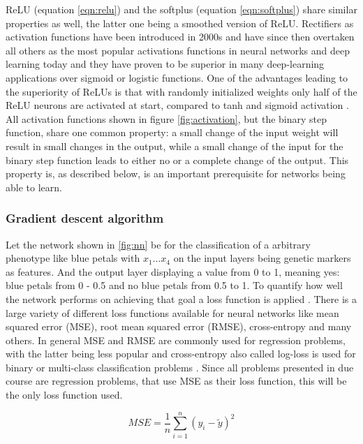 ReLU (equation \ref{eqn:relu}) and the softplus (equation \ref{eqn:softplus}) share similar properties as
well, the latter one being a smoothed version of ReLU. Rectifiers as activation functions have been introduced
in 2000s \cite{hahnloser2000digital} and have since then overtaken all others as the most popular activations
functions in neural networks and deep learning today \cite{lecun2015deep} and they have proven to be superior
in many deep-learning applications over sigmoid or logistic functions. One of the advantages leading to the
superiority of ReLUs is that with randomly initialized weights only half of the ReLU neurons are activated at start,
compared to tanh and sigmoid activation \cite{glorot2011deep}. All activation functions shown in figure
\ref{fig:activation}, but the binary step function, share one common property: a small change of the input
weight will result in small changes in the output, while a small change of the input for the binary step
function leads to either no or a complete change of the output. This property is, as described below, is an
important prerequisite for networks being able to learn. \\

\subsubsection{Gradient descent algorithm}

Let the network shown in \ref{fig:nn} be for the classification of a arbitrary phenotype like blue petals with
$x_1 \dots x_4$ on the input layers being genetic markers as features. And the output layer displaying a value
from 0 to 1, meaning yes: blue petals from 0 - 0.5 and no blue petals from 0.5 to 1. To quantify how well the
network performs on achieving that goal a loss function is applied \cite{schmidhuber2015deep}. There is a
large variety of different loss functions available for neural networks like mean squared error (MSE), root
mean squared error (RMSE), cross-entropy and many others. In general MSE and RMSE are commonly used for regression
problems, with the latter being less popular and cross-entropy also called log-loss is used for binary or
multi-class classification problems \cite{janocha2017loss}. Since all problems presented in due course are
regression problems, that use MSE as their loss function, this will be the only loss function used.

\begin{equation}
 MSE = \frac{1}{n} \sum_{i=1}^n (y_i - \widetilde{y})^2
 \label{eqn:MSE}
\end{equation}

